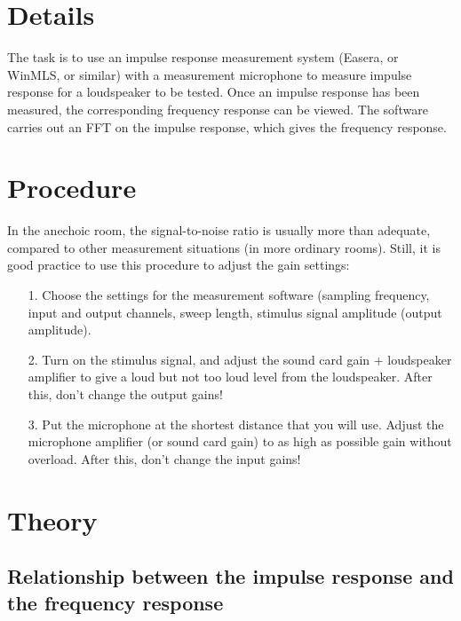 \documentclass{article}
\begin{document}
\section{Details}
The task is to use an impulse response measurement system (Easera, or WinMLS,
or similar) with  a measurement microphone to measure impulse response for a loudspeaker to be tested. 
Once an impulse response has been measured, the corresponding frequency response can be viewed. The software carries out an FFT on the impulse response, which gives the frequency response.

\section{Procedure}

In the anechoic room, the signal-to-noise ratio is usually more than adequate, compared to other measurement situations (in more ordinary rooms). 
 Still, it is good practice to use this procedure to adjust the gain settings:

\begin{itemize}
    \item [1.] Choose the settings for the measurement software (sampling frequency, input and output channels, sweep length, stimulus signal amplitude (output amplitude).
    \item[2.] Turn on the stimulus signal, and adjust the sound card gain + loudspeaker amplifier to give a loud but not too loud level from the loudspeaker. After this, don’t change the output gains!
    \item[3.] Put the microphone at the shortest distance that you will use. Adjust the microphone amplifier (or sound card gain) to as high as possible gain without overload. After this, don’t change the input gains!
\end{itemize}

\section{Theory}

\subsection{Relationship between the impulse response and the frequency response}

\end{document}
